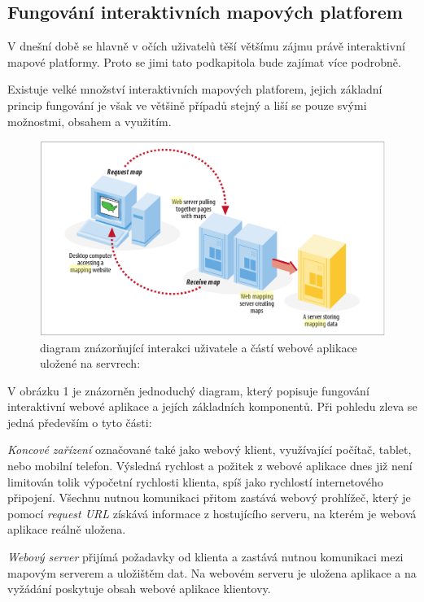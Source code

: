 \newpage
\subsection{Fungování interaktivních mapových platforem}

V dnešní době se hlavně v očích uživatelů těší většímu zájmu právě
interaktivní mapové platformy. Proto se jimi tato podkapitola bude
zajímat více podrobně.

Existuje velké množství interaktivních mapových platforem, jejich
základní princip fungování je však ve většině případů stejný a liší se
pouze svými možnostmi, obsahem a využitím.

\begin{figure}[h!]
	\centering
	\includegraphics[width=1\textwidth]{../img/map-web-diagram.png}
	\caption{diagram znázorňující interakci uživatele a částí webové aplikace uložené na servrech: \cite{web_mapping}}
	\label{fig:WPS_class_diagram}
\end{figure}

V obrázku 1 je znázorněn jednoduchý diagram, který popisuje fungování
interaktivní webové aplikace a jejích základních komponentů. Při
pohledu zleva se jedná především o tyto části:

\textit{Koncové zařízení} označované také jako webový klient,
využívající počítač, tablet, nebo mobilní telefon. Výsledná rychlost a
požitek z webové aplikace dnes již není limitován tolik výpočetní
rychlosti klienta, spíš jako rychlostí internetového
připojení. Všechnu nutnou komunikaci přitom zastává webový prohlížeč,
který je pomocí \textit{request URL} získává informace z hostujícího
serveru, na kterém je webová aplikace reálně uložena.

\textit{Webový server} přijímá požadavky od klienta a zastává nutnou
komunikaci mezi mapovým serverem a uložištěm dat. Na webovém serveru
je uložena aplikace a na vyžádání poskytuje obsah webové aplikace
klientovy.

